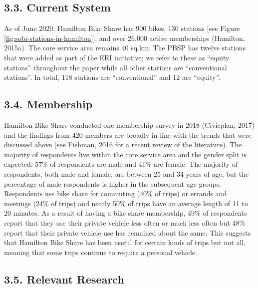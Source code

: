 \documentclass[]{elsarticle} %
\begin{document}
\hypertarget{current-system}{%
\subsection{3.3. Current System}\label{current-system}}

As of June 2020, Hamilton Bike Share has 900 bikes, 130 stations {[}see
Figure \ref{fig:sobi-stations-in-hamilton}{]}, and over 26,000 active
memberships (Hamilton, 2015a). The core service area remains 40 sq.km.
The PBSP has twelve stations that were added as part of the ERI
initiative; we refer to these as ``equity stations'' throughout the
paper while all other stations are ``conventional stations''. In total,
118 stations are ``conventional'' and 12 are ``equity''.

\hypertarget{membership}{%
\subsection{3.4. Membership}\label{membership}}

Hamilton Bike Share conducted one membership survey in 2018 (Civicplan,
2017) and the findings from 420 members are broadly in line with the
trends that were discussed above (see Fishman, 2016 for a recent review
of the literature). The majority of respondents live within the core
service area and the gender split is expected: 57\% of respondents are
male and 41\% are female. The majority of respondents, both male and
female, are between 25 and 34 years of age, but the percentage of male
respondents is higher in the subsequent age groups. Respondents use bike
share for commuting (40\% of trips) or errands and meetings (24\% of
trips) and nearly 50\% of trips have an average length of 11 to 20
minutes. As a result of having a bike share membership, 49\% of
respondents report that they use their private vehicle less often or
much less often but 48\% report that their private vehicle use has
remained about the same. This suggests that Hamilton Bike Share has been
useful for certain kinds of trips but not all, meaning that some trips
continue to require a personal vehicle.

\hypertarget{relevant-research}{%
\subsection{3.5. Relevant Research}\label{relevant-research}}
\end{document}
